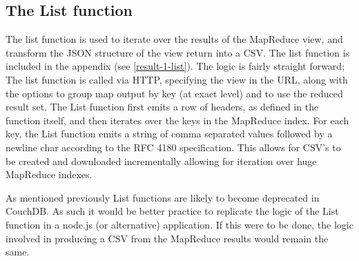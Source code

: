 \subsection*{The List function}
The list function is used to iterate over the results of the MapReduce view, and transform the JSON structure of the view return into a CSV. The list function is included in the appendix (see \ref{result-1-list}). The logic is fairly straight forward; The list function is called via HTTP, specifying the view in the URL, along with the options to group map output by key (at exact level) and to use the reduced result set. The List function first emits a row of headers, as defined in the function itself, and then iterates over the keys in the MapReduce index. For each key, the List function emits a string of comma separated values followed by a newline char according to the RFC 4180 specification. This allows for CSV's to be created and downloaded incrementally allowing for iteration over huge MapReduce indexes.

As mentioned previously List functions are likely to become deprecated in CouchDB. As such it would be better practice to replicate the logic of the List function in a node.js (or alternative) application. If this were to be done, the logic involved in producing a CSV from the MapReduce results would remain the same.
